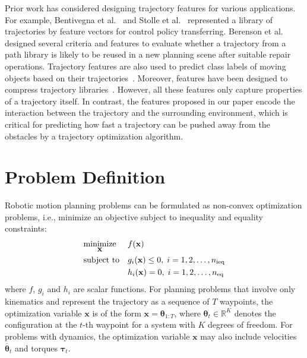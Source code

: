 \documentclass[letterpaper, 10 pt, conference]{ieeeconf}  %
\newcommand{\x}{\mbox{$\mathbf x$}}
\newcommand{\btheta}{\mbox{$\bm \theta$}}
\begin{document}
Prior work has considered designing trajectory features for various applications. For example, Bentivegna et al.~\cite{Bentivegna:2006:LST} and Stolle et al.~\cite{Stolle:2007:TPT} represented a library of trajectories by feature vectors for control policy transferring. 
Berenson et al.~\cite{Berenson:2012:RPP} designed several criteria and features to evaluate whether a trajectory from a path library is likely to be reused in a new planning scene after suitable repair operations. Trajectory features are also used to predict class labels of moving objects based on their trajectories~\cite{Lee:2008:TTC}. Moreover, features have been designed to compress trajectory libraries~\cite{Arikan:2006:CMC}. However, all these features only capture properties of a trajectory itself. In contrast, the features proposed in our paper encode the interaction between the trajectory and the surrounding environment, which is critical for predicting how fast a trajectory can be pushed away from the obstacles by a trajectory optimization algorithm.




\section{Problem Definition}
\label{sec:probstatement}

Robotic motion planning problems can be formulated as non-convex optimization problems, i.e., minimize an objective subject to inequality and equality constraints:
\begin{align}
\label{eq:opt}
& \underset{\x}{\text{minimize}}
& & f(\x) \\
& \text{subject to}
& & g_i(\x) \leq 0, \; i = 1, 2, \dots, n_{\text{ieq}} \notag \\
&&& h_i(\x) = 0, \; i = 1, 2, \dots, n_{\text{eq}} \notag
\end{align}
where $f$, $g_i$ and $h_i$ are scalar functions. For planning problems that involve only kinematics and represent the trajectory as a sequence of $T$ waypoints, the optimization variable $\x$ is of the form $\x = \btheta_{1:T}$, where $\btheta_t \in \mathbb{R}^K$ denotes the configuration at the $t$-th waypoint for a system with $K$ degrees of freedom. For problems with dynamics, the optimization variable $\x$ may also include velocities $\dot{\btheta_t}$ and torques ${\bm \tau}_t$.
\end{document}

